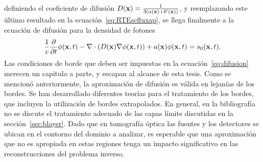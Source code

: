 definiendo el coeficiente de difusión $D(\mathbf{x})=\frac{1}{3(a(\mathbf{x})+b'(\mathbf{x}))}$, y reemplazando 
este último resultado en la ecuación~\eqref{eq:RTEscfluxap}, se 
llega finalmente a la ecuación de difusión para la densidad de fotones
\begin{equation}
\frac{1}{c}\frac{\partial}{\partial t} \phi(\mathbf{x},t)-\nabla \cdot \left( D(\mathbf{x}) \nabla  \phi(\mathbf{x},t) \right)
+a(\mathbf{x})\phi(\mathbf{x},t)=s_0(\mathbf{x},t).
\label{eq:difusion}
\end{equation}
Las condiciones de borde que deben ser impuestas en la ecuación~\eqref{eq:difusion} 
merecen un capitulo a parte, y escapan al alcance de esta tesis. Como se mencionó anteriormente, la aproximación de difusión es válida en lejanías 
de los bordes. Se han desarrollado diferentes teorías para el tratamiento de los bordes, 
que incluyen la utilización de bordes extrapolados. En general, en la bibliografía 
no se discute el tratamiento adecuado de las capas límite discutidas en la sección~\ref{sec:blayer}. Dado que en tomografía óptica las fuentes y los detectores 
se ubican en el contorno del dominio a analizar, es esperable que una aproximación 
que no es apropiada en estas regiones tenga un impacto significativo en las reconstrucciones del problema inverso. 
